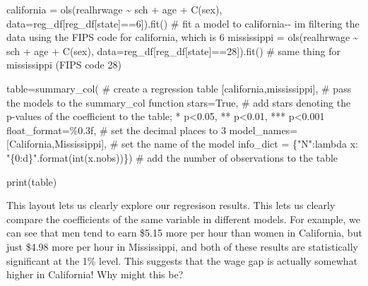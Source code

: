\documentclass[
  letterpaper,
  DIV=11,
  numbers=noendperiod]{scrreprt}
\newenvironment{Shaded}{\begin{snugshade}}{\end{snugshade}}
\newcommand{\BuiltInTok}[1]{\textcolor[rgb]{0.00,0.23,0.31}{#1}}
\newcommand{\CommentTok}[1]{\textcolor[rgb]{0.37,0.37,0.37}{#1}}
\newcommand{\DecValTok}[1]{\textcolor[rgb]{0.68,0.00,0.00}{#1}}
\newcommand{\KeywordTok}[1]{\textcolor[rgb]{0.00,0.23,0.31}{#1}}
\newcommand{\NormalTok}[1]{\textcolor[rgb]{0.00,0.23,0.31}{#1}}
\newcommand{\OperatorTok}[1]{\textcolor[rgb]{0.37,0.37,0.37}{#1}}
\newcommand{\SpecialCharTok}[1]{\textcolor[rgb]{0.37,0.37,0.37}{#1}}
\newcommand{\StringTok}[1]{\textcolor[rgb]{0.13,0.47,0.30}{#1}}
\newcommand{\VariableTok}[1]{\textcolor[rgb]{0.07,0.07,0.07}{#1}}
\begin{document}
\begin{Shaded}
\begin{Highlighting}[]
\NormalTok{california }\OperatorTok{=}\NormalTok{ ols(}\StringTok{\textquotesingle{}realhrwage \textasciitilde{}  sch + age + C(sex)\textquotesingle{}}\NormalTok{, data}\OperatorTok{=}\NormalTok{reg\_df[reg\_df[}\StringTok{\textquotesingle{}state\textquotesingle{}}\NormalTok{]}\OperatorTok{==}\DecValTok{6}\NormalTok{]).fit()  }\CommentTok{\# fit a model to california{-}{-} i\textquotesingle{}m filtering the data using the FIPS code for california, which is 6}
\NormalTok{mississippi }\OperatorTok{=}\NormalTok{ ols(}\StringTok{\textquotesingle{}realhrwage \textasciitilde{}  sch + age + C(sex)\textquotesingle{}}\NormalTok{, data}\OperatorTok{=}\NormalTok{reg\_df[reg\_df[}\StringTok{\textquotesingle{}state\textquotesingle{}}\NormalTok{]}\OperatorTok{==}\DecValTok{28}\NormalTok{]).fit()  }\CommentTok{\# same thing for mississippi (FIPS code 28)}

\NormalTok{table}\OperatorTok{=}\NormalTok{summary\_col( }\CommentTok{\# create a regression table }
\NormalTok{    [california,mississippi], }\CommentTok{\# pass the models to the summary\_col function}
\NormalTok{    stars}\OperatorTok{=}\VariableTok{True}\NormalTok{, }\CommentTok{\# add stars denoting the p{-}values of the coefficient to the table; * p\textless{}0.05, ** p\textless{}0.01, *** p\textless{}0.001}
\NormalTok{    float\_format}\OperatorTok{=}\StringTok{\textquotesingle{}}\SpecialCharTok{\%0.3f}\StringTok{\textquotesingle{}}\NormalTok{, }\CommentTok{\# set the decimal places to 3}
\NormalTok{    model\_names}\OperatorTok{=}\NormalTok{[}\StringTok{\textquotesingle{}California\textquotesingle{}}\NormalTok{,}\StringTok{\textquotesingle{}Mississippi\textquotesingle{}}\NormalTok{], }\CommentTok{\# set the name of the model}
\NormalTok{    info\_dict }\OperatorTok{=}\NormalTok{ \{}\StringTok{"N"}\NormalTok{:}\KeywordTok{lambda}\NormalTok{ x: }\StringTok{"}\SpecialCharTok{\{0:d\}}\StringTok{"}\NormalTok{.}\BuiltInTok{format}\NormalTok{(}\BuiltInTok{int}\NormalTok{(x.nobs))\}) }\CommentTok{\# add the number of observations to the table}

\BuiltInTok{print}\NormalTok{(table)}
\end{Highlighting}
\end{Shaded}

This layout lets us clearly explore our regresison results. This lets us
clearly compare the coefficients of the same variable in different
models. For example, we can see that men tend to earn \$5.15 more per
hour than women in California, but just \$4.98 more per hour in
Mississippi, and both of these results are statistically significant at
the 1\% level. This suggests that the wage gap is actually somewhat
higher in California! Why might this be?
\end{document}
